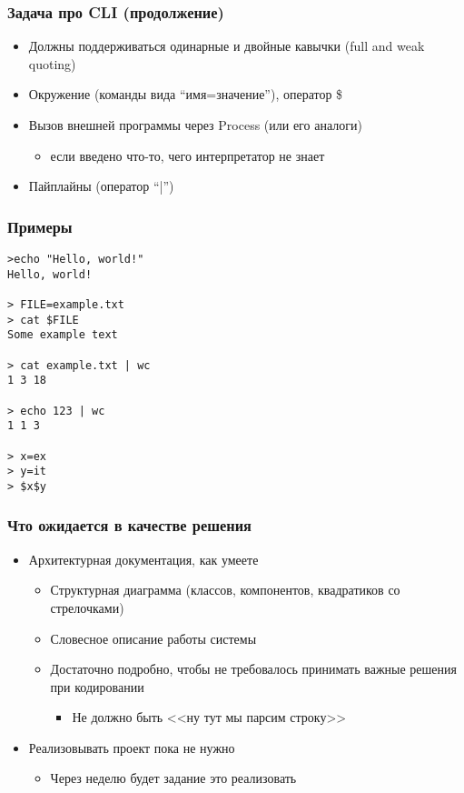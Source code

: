 \documentclass[xetex,mathserif,serif]{beamer}
\begin{document}
    \begin{frame}
        \frametitle{Задача про CLI (продолжение)}
        \begin{itemize}
            \item Должны поддерживаться одинарные и двойные кавычки (full and weak quoting)
            \item Окружение (команды вида ``имя=значение''), оператор \$
            \item Вызов внешней программы через Process (или его аналоги)
            \begin{itemize}
                \item если введено что-то, чего интерпретатор не знает
            \end{itemize}
            \item Пайплайны (оператор ``|'')
        \end{itemize}
    \end{frame}
    
    \begin{frame}[fragile]
        \frametitle{Примеры}
        \begin{small}
            \begin{verbatim}
>echo "Hello, world!"
Hello, world!

> FILE=example.txt
> cat $FILE
Some example text

> cat example.txt | wc
1 3 18

> echo 123 | wc
1 1 3

> x=ex
> y=it
> $x$y
            \end{verbatim}
        \end{small}
    \end{frame}

    \begin{frame}
        \frametitle{Что ожидается в качестве решения}
        \begin{itemize}
            \item Архитектурная документация, как умеете
            \begin{itemize}
                \item Структурная диаграмма (классов, компонентов, квадратиков со стрелочками)
                \item Словесное описание работы системы
                \item Достаточно подробно, чтобы не требовалось принимать важные решения при кодировании
                \begin{itemize}
                    \item Не должно быть <<ну тут мы парсим строку>>
                \end{itemize}
            \end{itemize}
            \item Реализовывать проект пока не нужно
            \begin{itemize}
                \item Через неделю будет задание это реализовать
            \end{itemize}
        \end{itemize}
    \end{frame}
\end{document}
